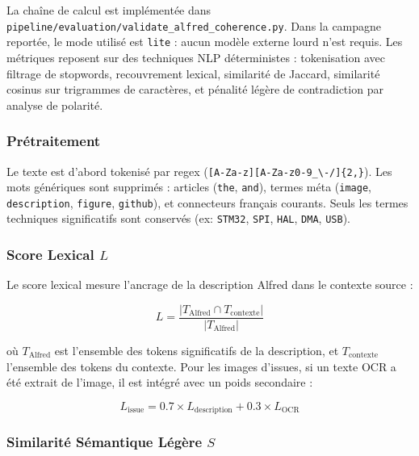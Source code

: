\documentclass[12pt,a4paper]{report}
\begin{document}
La chaîne de calcul est implémentée dans \texttt{pipeline/evaluation/validate\_alfred\_coherence.py}. Dans la campagne reportée, le mode utilisé est \texttt{lite} : aucun modèle externe lourd n'est requis. Les métriques reposent sur des techniques NLP déterministes : tokenisation avec filtrage de stopwords, recouvrement lexical, similarité de Jaccard, similarité cosinus sur trigrammes de caractères, et pénalité légère de contradiction par analyse de polarité.

\subsubsection{Prétraitement}

Le texte est d'abord tokenisé par regex (\texttt{[A-Za-z][A-Za-z0-9\_\textbackslash{}-/]\{2,\}}). Les mots génériques sont supprimés : articles (\texttt{the}, \texttt{and}), termes méta (\texttt{image}, \texttt{description}, \texttt{figure}, \texttt{github}), et connecteurs français courants. Seuls les termes techniques significatifs sont conservés (ex: \texttt{STM32}, \texttt{SPI}, \texttt{HAL}, \texttt{DMA}, \texttt{USB}).

\subsubsection{Score Lexical $L$}

Le score lexical mesure l'ancrage de la description Alfred dans le contexte source :

\begin{equation}
L =
\frac{|T_{\text{Alfred}} \cap T_{\text{contexte}}|}
{|T_{\text{Alfred}}|}
\label{eq:alfred_lexical_grounding}
\end{equation}

où $T_{\text{Alfred}}$ est l'ensemble des tokens significatifs de la description, et $T_{\text{contexte}}$ l'ensemble des tokens du contexte. Pour les images d'issues, si un texte OCR a été extrait de l'image, il est intégré avec un poids secondaire :

\begin{equation}
L_{\text{issue}} = 0.7 \times L_{\text{description}} + 0.3 \times L_{\text{OCR}}
\label{eq:alfred_issue_lexical}
\end{equation}

\subsubsection{Similarité Sémantique Légère $S$}
\end{document}
